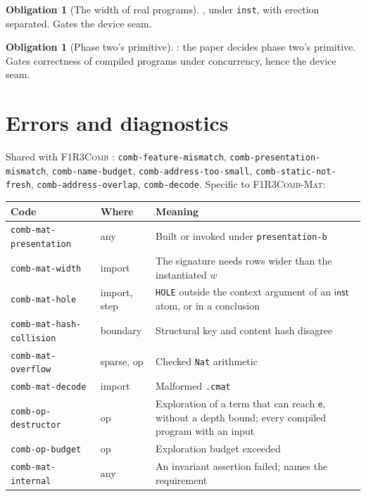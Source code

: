 \documentclass[11pt,a4paper]{article}
\newcommand{\code}[1]{\texttt{#1}}
\newcommand{\Comb}{\textsc{F1R3Comb}}
\newcommand{\Mat}{\textsc{F1R3Comb-Mat}}
\newcommand{\ev}{\mathsf{e}}
\theoremstyle{definition}
\newtheorem{obligation}[definition]{Obligation}
\theoremstyle{plain}
\newcommand{\inst}{\mathsf{inst}}
\begin{document}
\begin{obligation}[The width of real programs]\label{obl:width}
\cite[Obl.~13.7]{matnote}, under \code{inst}, with erection separated. Gates
the device seam.
\end{obligation}

\begin{obligation}[Phase two's primitive]\label{obl:inst}
\cite[Obl.~14.5]{matnote}: the paper decides phase two's primitive. Gates
correctness of compiled programs under concurrency, hence the device seam.
\end{obligation}

\section{Errors and diagnostics}\label{sec:errors}

Shared with \Comb{} \cite[\S12]{combspec}: \code{comb-feature-mismatch},
\code{comb-presentation-mismatch}, \code{comb-name-budget},
\code{comb-address-too-small}, \code{comb-static-not-fresh},
\code{comb-address-overlap}, \code{comb-decode}. Specific to \Mat:

\begin{center}
\begin{tabularx}{\linewidth}{@{}ll>{\raggedright\arraybackslash}X@{}}
\toprule
Code & Where & Meaning\\
\midrule
\code{comb-mat-presentation} & any & Built or invoked under
\code{presentation-b}\\
\code{comb-mat-width} & import & The signature needs rows wider than the
instantiated $w$\\
\code{comb-mat-hole} & import, step & \code{HOLE} outside the context
argument of an $\inst$ atom, or in a conclusion\\
\code{comb-mat-hash-collision} & boundary & Structural key and content hash
disagree\\
\code{comb-mat-overflow} & sparse, op & Checked \code{Nat} arithmetic\\
\code{comb-mat-decode} & import & Malformed \code{.cmat}\\
\code{comb-op-destructor} & op & Exploration of a term that can reach $\ev$,
without a depth bound; every compiled program with an input\\
\code{comb-op-budget} & op & Exploration budget exceeded\\
\code{comb-mat-internal} & any & An invariant assertion failed; names the
requirement\\
\bottomrule
\end{tabularx}
\end{center}
\end{document}
